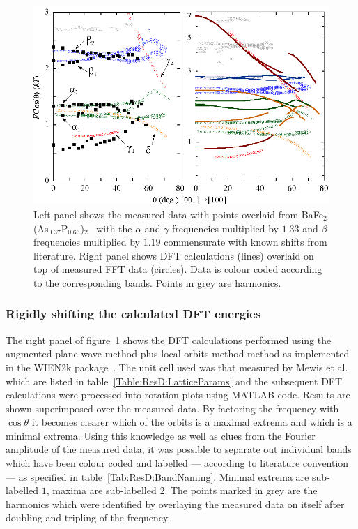 \begin{figure}[htbp]
    \begin{center}
        \includegraphics[scale=1.0]{Chapter-dHvABaFe2P2/Figures/AngleDepMeasurements/IdentifyingBands/IdentifyingBands}
        \caption{Left panel shows the measured data with points overlaid from BaFe$_2$(As$_{0.37}$P$_{0.63}$)$_2$~\cite{Analytis2010c} with the $\alpha$ and $\gamma$ frequencies multiplied by $1.33$ and $\beta$ frequencies multiplied by $1.19$ commensurate with known shifts from literature. Right panel shows \ac{DFT} calculations (lines) overlaid on top of measured \ac{FFT} data (circles). Data is colour coded according to the corresponding bands. Points in grey are harmonics.}
        \label{Fig:ResD:IdentifyingBands}
    \end{center}
\end{figure}



\subsubsection{Rigidly shifting the calculated \ac{DFT} energies}
    \label{Sec:ResD:DFTShifts}

The right panel of figure~\ref{Fig:ResD:IdentifyingBands} shows the \ac{DFT} calculations performed using the augmented plane wave method plus local orbits method method as implemented in the WIEN2k package~\cite{Blaha2001}. The unit cell used was that measured by Mewis et al. which are listed in table~\ref{Table:ResD:LatticeParams} and the subsequent \ac{DFT} calculations were processed into rotation plots using MATLAB code. Results are shown superimposed over the measured data. By factoring the frequency with $\cos{\theta}$ it becomes clearer which of the orbits is a maximal extrema and which is a minimal extrema. Using this knowledge as well as clues from the Fourier amplitude of the measured data, it was possible to separate out individual bands which have been colour coded and labelled --- according to literature convention --- as specified in table~\ref{Tab:ResD:BandNaming}. Minimal extrema are sub-labelled $1$, maxima are sub-labelled $2$. The points marked in grey are the harmonics which were identified by overlaying the measured data on itself after doubling and tripling of the frequency.

